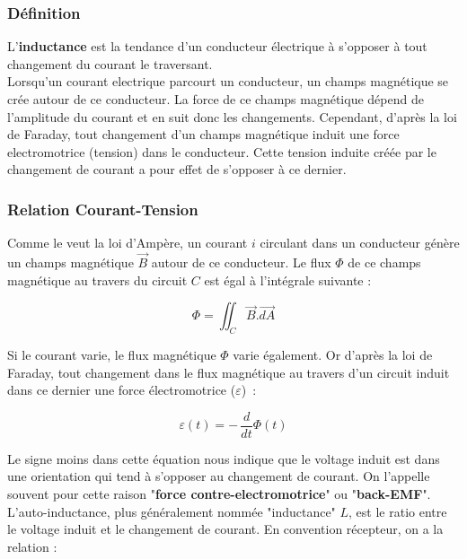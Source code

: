 \subsubsection*{Définition}

L'\textbf{inductance} est la tendance d'un conducteur électrique à s'opposer à tout changement du courant le traversant. \\

Lorsqu'un courant electrique parcourt un conducteur, un champs magnétique se crée autour de ce conducteur. La force de ce champs magnétique dépend de l'amplitude du courant et en suit donc les changements. Cependant, d'après la loi de Faraday, tout changement d'un champs magnétique induit une force electromotrice (tension) dans le conducteur. Cette tension induite créée par le changement de courant a pour effet de s'opposer à ce dernier. \\

\subsubsection{Relation Courant-Tension}

Comme le veut la loi d'Ampère, un courant $i$ circulant dans un conducteur génère un champs magnétique $\vec{B}$ autour de ce conducteur. Le flux $\Phi$ de ce champs magnétique au travers du circuit $C$ est égal à l'intégrale suivante : 

$$\Phi = \iint_{C}{\vec{B}.\vec{dA}}$$ 

Si le courant varie, le flux magnétique $\Phi$ varie également. Or d'après la loi de Faraday, tout changement dans le flux magnétique au travers d'un circuit induit dans ce dernier une force électromotrice ($ \varepsilon $)~:

$$ \varepsilon (t) = - \,\dfrac{d}{dt} \Phi(t) $$

Le signe moins dans cette équation nous indique que le voltage induit est dans une orientation qui tend à s'opposer au changement de courant. On l'appelle souvent pour cette raison "\textbf{force contre-electromotrice}" ou "\textbf{back-EMF}".\\

L'{auto-inductance}, plus généralement nommée "inductance" $L$, est le ratio entre le voltage induit et le changement de courant. En convention récepteur, on a la relation :

